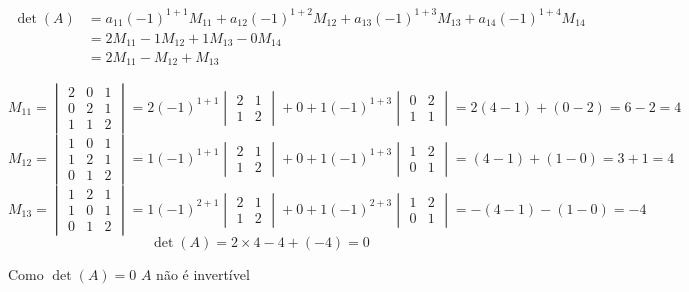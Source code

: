 \documentclass[a4paper,12pt,fleqn]{article}
\begin{document}
\begin{answer}
\begin{align*}
  \det(A)
  & = a_{11}(-1)^{1+1} M_{11}
    + a_{12}(-1)^{1+2} M_{12}
    + a_{13}(-1)^{1+3} M_{13}
    + a_{14}(-1)^{1+4} M_{14} \\
  & = 2 M_{11} - 1 M_{12} + 1 M_{13} - 0 M_{14}   \\
  & = 2 M_{11} - M_{12} + M_{13}
\end{align*}

\[
  M_{11}
  = \begin{vmatrix}
    2 & 0 & 1 \\
    0 & 2 & 1 \\
    1 & 1 & 2
  \end{vmatrix}
  = 2 (-1)^{1+1}
  \begin{vmatrix}
    2 & 1 \\
    1 & 2
  \end{vmatrix}
  + 0
  + 1 (-1)^{1+3}
  \begin{vmatrix}
    0 & 2 \\
    1 & 1
  \end{vmatrix}
  = 2(4-1)+(0-2)
  = 6 - 2
  = 4
\]
\[
  M_{12}
  = \begin{vmatrix}
    1 & 0 & 1 \\
    1 & 2 & 1 \\
    0 & 1 & 2
  \end{vmatrix}
  = 1 (-1)^{1+1}
  \begin{vmatrix}
    2 & 1 \\
    1 & 2
  \end{vmatrix}
  + 0
  + 1 (-1)^{1+3}
  \begin{vmatrix}
    1 & 2 \\
    0 & 1
  \end{vmatrix}
  = (4-1)+(1-0)
  = 3 + 1
  = 4
\]
\[
  M_{13}
  = \begin{vmatrix}
    1 & 2 & 1 \\
    1 & 0 & 1 \\
    0 & 1 & 2
  \end{vmatrix}
  = 1 (-1)^{2+1}
  \begin{vmatrix}
    2 & 1 \\
    1 & 2
  \end{vmatrix}
  + 0
  + 1 (-1)^{2+3}
  \begin{vmatrix}
    1 & 2 \\
    0 & 1
  \end{vmatrix}
  = -(4-1) - (1-0)
  = -4
\]
\[
  \det(A)
  = 2 \times 4 - 4 + (-4)
  = 0
\]

Como
\(
  \det(A) = 0
\)
$A$ não é invertível
\end{answer}
\end{document}
